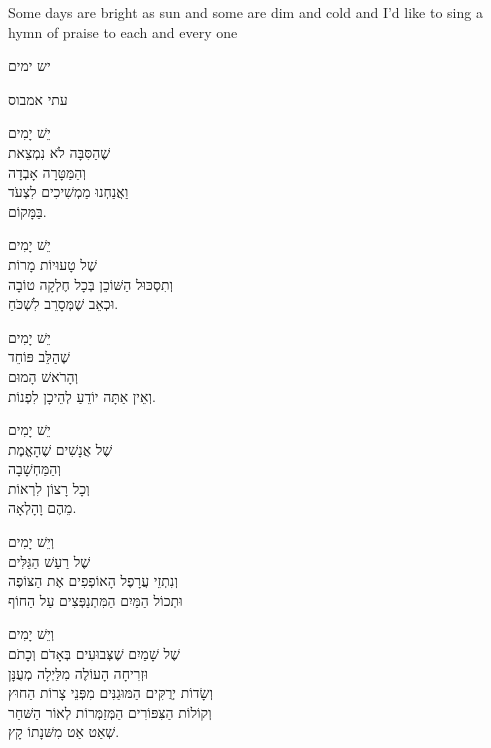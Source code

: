 \documentclass{article}
\begin{document}
        Some days are bright as sun
        and some are dim and cold
        and I'd like to sing a hymn of praise
        to each and every one

    \pagebreak

    \begin{hebrew}

        \begin{center}
          {\huge יש ימים}

          {\Large עתי אמבוס}
        \end{center}

        \maketitle

        יֵשׁ יָמִים \\
        שֶׁהַסִּבָּה לֹא נִמְצֵאת \\
        וְהַמַּטָּרָה אָבְדָה \\
        וַאֲנַחְנוּ מַמְשִׁיכִים לִצְעֹד \\
        בַּמָּקוֹם.

        יֵשׁ יָמִים \\
        שֶׁל טָעוּיוֹת מָרוֹת \\
        וְתִסְכּוּל הַשּׁוֹכֵן בְּכָל חֶלְקָה טוֹבָה \\
        וּכְאֵב שֶׁמְּסָרֵב לִשְׁכֹּחַ.

        יֵשׁ יָמִים \\
        שֶׁהַלֵּב פּוֹחֵד \\
        וְהָרֹאשׁ הָמוּם \\
        וְאֵין אַתָּה יוֹדֵעַ לְהֵיכָן לִפְנוֹת.

        יֵשׁ יָמִים \\
        שֶׁל אֲנָשִׁים שֶׁהָאֱמֶת \\
        וְהַמַּחְשָׁבָה \\
        וְכָל רָצוֹן לִרְאוֹת \\
        מֵהֶם וָהָלְאָה.


        וְיֵשׁ יָמִים \\
        שֶׁל רַעַשׁ הַגַּלִּים \\
        וְנִתְזֵי עֲרָפֶל הָאוֹפְפִים אֶת הַצּוֹפֶה \\
        וּתְכוֹל הַמַּיִם הַמִּתְנַפְּצִים עַל הַחוֹף

        וְיֵשׁ יָמִים \\
        שֶׁל שָׁמַיִם שֶׁצְּבוּעִים בְּאָדֹם וְכָתֹם \\
        וּזְרִיחָה הָעוֹלֶה מִלַּיְלָה מְעֻנָּן \\
        וְשָׂדוֹת יְרֻקִּים הַמּוּגַנִּים מִפְּנֵי צָרוֹת הַחוּץ \\
        וְקוֹלוֹת הַצִּפּוֹרִים הַמְּזַמְּרוֹת לְאוֹר הַשּׁחַר \\
        שְׁאַט אַט מִשּׁנָתוֹ קָץ.


\end{hebrew}
\end{document}
